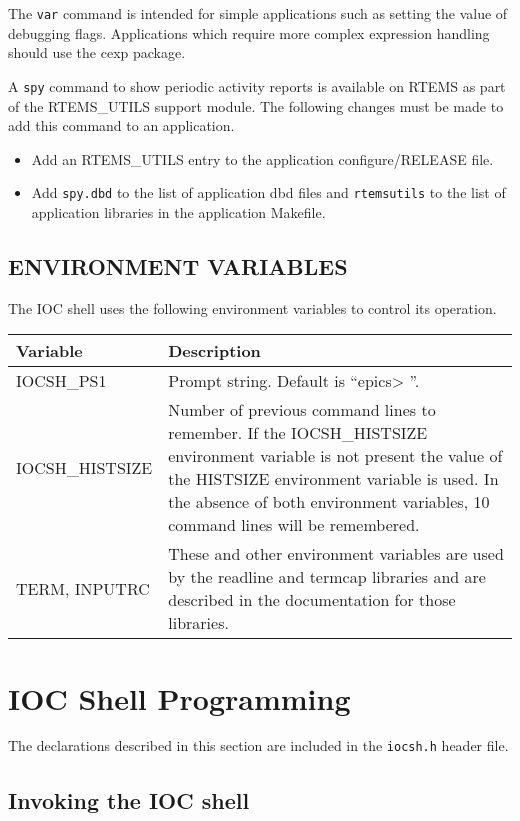 The \verb|var| command is intended for simple applications such as setting the value of debugging flags.  Applications which 
require more complex expression handling should use the cexp package.

A \verb|spy| command to show periodic activity reports is available on RTEMS as part of the RTEMS\_UTILS support module.  
The following changes must be made to add this command to an application.

\begin{itemize}\item Add an RTEMS\_UTILS entry to the application configure/RELEASE file.

\item Add \verb|spy.dbd| to the list of application dbd files and \verb|rtemsutils| to the list of application libraries in the 
application Makefile.

\end{itemize}\subsection{ENVIRONMENT VARIABLES}

The IOC shell uses the following environment variables to control its operation.
\begin{center}\begin{longtable}{p{1.305in}p{5.46in}}
Variable & Description\\
\hline
IOCSH\_PS1 & Prompt string. Default is ``epics\textgreater{} ''.\\
IOCSH\_HISTSIZE & Number of previous command lines to remember. If the IOCSH\_HISTSIZE environment variable is not present the value of the HISTSIZE environment variable is used.  In the absence of both environment variables, 10 command lines will be remembered.\\
TERM, INPUTRC & These and other environment variables are used by the readline and termcap libraries and are described in the documentation for those libraries.
\end{longtable}\end{center}


\section{IOC Shell Programming}

The declarations described in this section are included in the \verb|iocsh.h| header file.

\subsection{Invoking the IOC shell}

